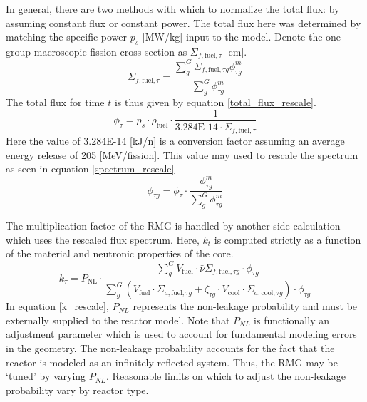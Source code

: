 In general, there are two methods with which to normalize the total flux: by assuming constant flux
or constant power.  The total flux here was determined by matching the specific power $p_s$ [MW/kg] 
input to the model.  Denote the one-group macroscopic 
fission cross section as $\Sigma_{f,\mbox{fuel},\tau}$ [cm].
\begin{equation}
\label{one_group_fission}
\Sigma_{f,\mbox{fuel},\tau} = \frac{\sum_g^G \Sigma_{f,\mbox{fuel},\tau g}\phi_{\tau g}^m}
                                   {\sum_g^G \phi_{\tau g}^m}
\end{equation}
The total flux for time $t$ is thus given by equation \ref{total_flux_rescale}.
\begin{equation}
\label{total_flux_rescale}
\phi_{\tau} = p_s \cdot  \rho_{\mbox{fuel}} \cdot \frac{1}
                                                       {\mbox{3.284E-14} \cdot \Sigma_{f,\mbox{fuel},\tau}}
\end{equation}
Here the value of 3.284E-14 [kJ/n] is a conversion factor assuming an average 
energy release of 205 [MeV/fission].  This value may used to rescale the spectrum 
as seen in equation \ref{spectrum_rescale}
\begin{equation}
\label{spectrum_rescale}
\phi_{\tau g} = \phi_{\tau} \cdot  \frac{\phi_{\tau g}^m}
                                        {\sum_g^G \phi_{\tau g}^m}
\end{equation}

The multiplication factor of the RMG is handled by another side calculation which 
uses the rescaled flux spectrum.  Here, $k_t$ is computed strictly as a function of the 
material and neutronic properties of the core.
\begin{equation}
\label{k_rescale}
k_{\tau} = P_{\mbox{NL}} \cdot \frac{\sum_g^G V_{\mbox{fuel}} \cdot \bar{\nu}\Sigma_{f,\mbox{fuel},\tau g} \cdot \phi_{\tau g}}
                                    {\sum_g^G \left(V_{\mbox{fuel}} \cdot \Sigma_{a,\mbox{fuel},\tau g} + \zeta_{\tau g} \cdot V_{\mbox{cool}} \cdot \Sigma_{a,\mbox{cool},\tau g}\right) \cdot  \phi_{\tau g}}
\end{equation}
In equation \ref{k_rescale}, $P_{NL}$ represents the non-leakage probability and must be externally supplied
to the reactor model.  Note that $P_{NL}$ is functionally an adjustment parameter
which is used to account for fundamental modeling errors in the geometry.  The non-leakage 
probability accounts for the fact that the reactor is modeled as an infinitely reflected system.
Thus, the RMG may be `tuned'
by varying $P_{NL}$.  Reasonable limits on which to adjust the non-leakage probability
vary by reactor type.  


